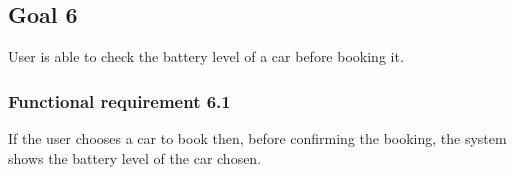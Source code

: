 \subsection{Goal 6}
User is able to check the battery level of a car before booking it.

\setcounter{secnumdepth}{3}
\subsubsection{Functional requirement 6.1}
If the user chooses a car to book then, before confirming the booking, the system shows the battery level of the car chosen.